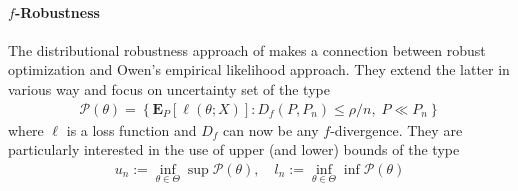 \documentclass{article}
\newcommand{\E}{{\mathbf E}}
\begin{document}
\paragraph{$f$-Robustness} The distributional robustness approach of \cite{duchi2016statistics} makes a connection between robust optimization and Owen's empirical likelihood approach. They extend the latter in various way and focus on uncertainty set of the type 
\begin{align}
\mathcal P(\theta) = \left\{ \E_P\left[ \ell(\theta; X) \right]: D_f\left(P,P_n\right) \leq \rho/n, \; P \ll P_n  \right\}
\end{align}
where $\ell$ is a loss function and $D_f$ can now be any $f$-divergence. They are particularly interested in the use of upper (and lower) bounds of the type
\begin{align}
u_n := \inf_{\theta \in \Theta} \sup \mathcal P(\theta), \quad 
l_n :=  \inf_{\theta \in \Theta} \inf \mathcal P(\theta)
\end{align}




\end{document}
